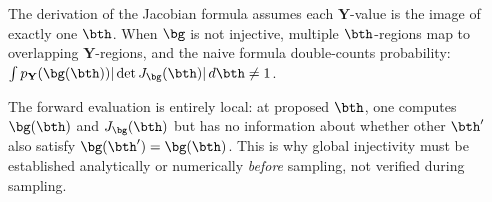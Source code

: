The derivation of the Jacobian formula assumes each $\mathbf{Y}$-value is the
image of exactly one $\bth$. When $\bg$ is not injective,
multiple $\bth$-regions map to overlapping $\mathbf{Y}$-regions,
and the naive formula double-counts probability:
$\int p_{\mathbf{Y}}(\bg(\bth))
|\det J_{\bg}(\bth)| \, d\bth \neq 1$.

The forward evaluation is entirely local: at proposed $\bth$,
one computes $\bg(\bth)$ and
$J_{\bg}(\bth)$ but has no information about whether
other $\bth'$ also satisfy
$\bg(\bth') = \bg(\bth)$.
This is why global injectivity must be established analytically or numerically
\textit{before} sampling, not verified during sampling.


